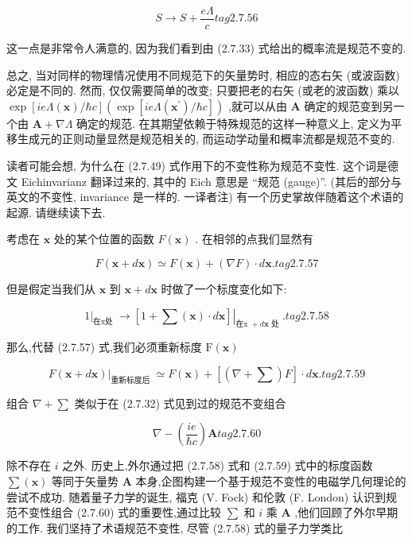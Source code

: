 \documentclass[lang=cn,newtx,10pt,scheme=chinese,thmcnt=section]{elegantbook}
\begin{document}
$$
S \rightarrow S + \frac{e\Lambda }{c} tag{2.7.56}
$$

这一点是非常令人满意的, 因为我们看到由 (2.7.33) 式给出的概率流是规范不变的.

总之, 当对同样的物理情况使用不同规范下的矢量势时, 相应的态右矢 (或波函数) 必定是不同的. 然而, 仅仅需要简单的改变; 只要把老的右矢 (或老的波函数) 乘以 $\exp \left\lbrack {{ie\Lambda }\left( \mathbf{x}\right) /\hbar c}\right\rbrack \left( {\exp \left\lbrack {{ie\Lambda }\left( {\mathbf{x}}^{\prime }\right) /\hbar c}\right\rbrack }\right)$ ,就可以从由 $\mathbf{A}$ 确定的规范变到另一个由 $\mathbf{A} + \nabla \Lambda$ 确定的规范. 在其期望依赖于特殊规范的这样一种意义上, 定义为平移生成元的正则动量显然是规范相关的, 而运动学动量和概率流都是规范不变的.

读者可能会想, 为什么在 (2.7.49) 式作用下的不变性称为规范不变性. 这个词是德文 Eichinvarianz 翻译过来的, 其中的 Eich 意思是 “规范 (gauge)”. (其后的部分与英文的不变性, invariance 是一样的. 一译者注) 有一个历史掌故伴随着这个术语的起源. 请继续读下去.

考虑在 $\mathbf{x}$ 处的某个位置的函数 $F\left( \mathbf{x}\right)$ . 在相邻的点我们显然有

$$
F\left( {\mathbf{x} + d\mathbf{x}}\right) \simeq F\left( \mathbf{x}\right) + \left( {\nabla F}\right) \cdot d\mathbf{x}. tag{2. 7.57}
$$

但是假定当我们从 $\mathbf{x}$ 到 $\mathbf{x} + d\mathbf{x}$ 时做了一个标度变化如下:

$$
{\left. 1\right| }_{\text{在x处 }} \rightarrow {\left. \left\lbrack 1 + \sum \left( \mathbf{x}\right) \cdot d\mathbf{x}\right\rbrack \right| }_{\text{在x } + d\mathbf{x}\text{ 处 }}. tag{2. 7.58}
$$

那么,代替 (2.7.57) 式,我们必须重新标度 $\mathrm{F}\left( \mathbf{x}\right)$

$$
{\left. F\left( \mathbf{x} + d\mathbf{x}\right) \right| }_{\text{重新标度后 }} \simeq F\left( \mathbf{x}\right) + \left\lbrack {\left( {\nabla + \mathbf{\sum }}\right) F}\right\rbrack \cdot d\mathbf{x}. tag{2. 7.59}
$$

组合 $\nabla + \mathbf{\sum }$ 类似于在 (2.7.32) 式见到过的规范不变组合

$$
\nabla - \left( \frac{ie}{\hbar c}\right) \mathbf{A} tag{2. 7.60}
$$

除不存在 $i$ 之外. 历史上,外尔通过把 (2.7.58) 式和 (2.7.59) 式中的标度函数 $\mathbf{\sum }\left( \mathbf{x}\right)$ 等同于矢量势 $\mathbf{A}$ 本身,企图构建一个基于规范不变性的电磁学几何理论的尝试不成功. 随着量子力学的诞生, 福克 (V. Fock) 和伦敦 (F. London) 认识到规范不变性组合 (2.7.60) 式的重要性,通过比较 $\mathbf{\sum }$ 和 $i$ 乘 $\mathbf{A}$ ,他们回顾了外尔早期的工作. 我们坚持了术语规范不变性, 尽管 (2.7.58) 式的量子力学类比
\end{document}
